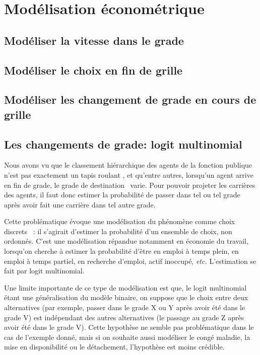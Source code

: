 \documentclass[11pt,a4paper]{article}
\begin{document}
\else \fi



\section{Modélisation économétrique}



\subsection{Modéliser la vitesse dans le grade}


\subsection{Modéliser le \og choix \fg{} en fin de grille}


\subsection{Modéliser les changement de grade en cours de grille}



\subsection{Les changements de grade: logit multinomial}

Nous avons vu %
que le classement hiérarchique des agents de la fonction publique n'est pas exactement un \og tapis roulant \fg, et qu'entre autres, lorsqu'un agent arrive en fin de grade, 
le grade de \og destination \fg\ varie. Pour pouvoir projeter les carrières des agents, il faut donc estimer la probabilité de passer dans tel ou tel grade après avoir fait
une carrière dans tel autre grade.

Cette problématique évoque une modélisation du phénomène comme \og choix discrets \fg\ : il s'agirait d'estimer la probabilité d'un ensemble de choix, non ordonnés.
C'est une modélisation répandue notamment en économie du travail, lorsqu'on cherche à estimer la probabilité d'être en emploi à temps plein, en emploi à temps partiel,
en recherche d'emploi, actif inoccupé, \textit{etc.} L'estimation se fait par logit multinomial.

Une limite importante de ce type de modélisation est que, le logit multinomial étant une généralisation du modèle binaire, on suppose que le choix entre deux alternatives
(par exemple, passer dans le grade X ou Y après avoir été dans le grade V) est indépendant des autres alternatives (le passage au grade Z après avoir été dans le grade V).
Cette hypothèse ne semble pas problématique dans le cas de l'exemple donné, mais si on souhaite aussi modéliser le congé maladie, la mise en disponibilité ou le détachement,
l'hypothèse est moins crédible.%
\end{document}

